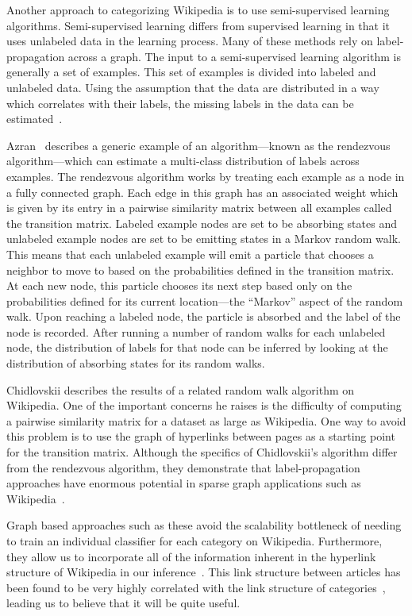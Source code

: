 \documentclass{sig-alternate}
\begin{document}
Another approach to categorizing Wikipedia is to use semi-supervised learning algorithms. Semi-supervised learning differs from supervised learning in that it uses unlabeled data in the learning process. Many of these methods rely on label-propagation across a graph. The input to a semi-supervised learning algorithm is generally a set of examples. This set of examples is divided into labeled and unlabeled data. Using the assumption that the data are distributed in a way which correlates with their labels, the missing labels in the data can be estimated~\cite{Carlson}.

Azran~\cite{Azran} describes a generic example of an algorithm---known as the rendezvous algorithm---which can estimate a multi-class distribution of labels across examples. The rendezvous algorithm works by treating each example as a node in a fully connected graph. Each edge in this graph has an associated weight which is given by its entry in a pairwise similarity matrix between all examples called the transition matrix. Labeled example nodes are set to be absorbing states and unlabeled example nodes are set to be emitting states in a Markov random walk.  This means that each unlabeled example will emit a particle that chooses a neighbor to move to based on the probabilities defined in the transition matrix. At each new node, this particle chooses its next step based only on the probabilities defined for its current location---the ``Markov'' aspect of the random walk. Upon reaching a labeled node, the particle is absorbed and the label of the node is recorded. After running a number of random walks for each unlabeled node, the distribution of labels for that node can be inferred by looking at the distribution of absorbing states for its random walks.

Chidlovskii describes the results of a related random walk algorithm on Wikipedia. One of the important concerns he raises is the difficulty of computing a pairwise similarity matrix for a dataset as large as Wikipedia. One way to avoid this problem is to use the graph of hyperlinks between pages as a starting point for the transition matrix. Although the specifics of Chidlovskii's algorithm differ from the rendezvous algorithm, they demonstrate that label-propagation approaches have enormous potential in sparse graph applications such as Wikipedia~\cite{Chidlovskii}.

Graph based approaches such as these avoid the scalability bottleneck of needing to train an individual classifier for each category on Wikipedia. Furthermore, they allow us to incorporate all of the information inherent in the hyperlink structure of Wikipedia in our inference~\cite{Avrachenkov}. This link structure between articles has been found to be very highly correlated with the link structure of categories~\cite{Ponzetto, Holloway}, leading us to believe that it will be quite useful.
\end{document}
